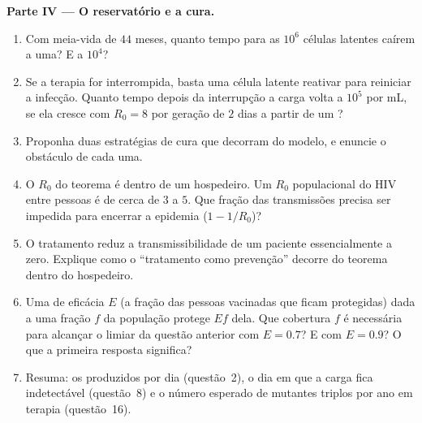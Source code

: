 \begin{problem}
\medskip
\noindent\textbf{Parte IV --- O reservatório e a cura.}
\begin{enumerate}[resume]
  \item Com meia-vida de $44$ meses, quanto tempo para as $10^{6}$
        células latentes caírem a uma? E a $10^{4}$?
  \item Se a terapia for interrompida, basta uma célula latente
        reativar para reiniciar a infecção. Quanto tempo depois da
        interrupção a carga volta a $10^{5}$ por mL, se ela cresce com
        $R_{0} = 8$ por geração de $2$ dias a partir de um ?
  \item Proponha duas estratégias de cura que decorram do modelo, e
        enuncie o obstáculo de cada uma.
  \item O $R_{0}$ do teorema é dentro de um hospedeiro. Um $R_{0}$
        populacional do HIV entre pessoas é de cerca de $3$ a $5$. Que
        fração das transmissões precisa ser impedida para encerrar a
        epidemia ($1 - 1/R_{0}$)?
  \item O tratamento reduz a transmissibilidade de um paciente
        essencialmente a zero. Explique como o ``tratamento como
        prevenção'' decorre do teorema dentro do hospedeiro.
  \item Uma  de eficácia $E$ (a fração das pessoas vacinadas que
        ficam protegidas) dada a uma fração $f$ da população protege
        $Ef$ dela. Que cobertura $f$ é necessária para alcançar o
        limiar da questão anterior com $E = 0.7$? E com $E = 0.9$? O
        que a primeira resposta significa?
  \item Resuma: os  produzidos por dia (questão~2), o dia em que
        a carga fica indetectável (questão~8) e o número esperado de
        mutantes triplos por ano em terapia (questão~16).
\end{enumerate}
\end{problem}
